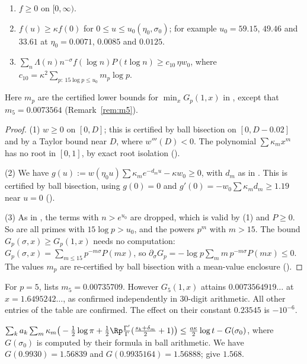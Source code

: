 \begin{lemma}\label{lem:L1011}
\begin{enumerate}
\item $f \ge 0$ on $[0,\infty)$.
\item $f(u) \ge \kappa f(0)$ for $0 \le u \le u_0(\eta_0,\sigma_0)$; for example $u_0 = 59.15$, $49.46$ and $33.61$ at $\eta_0 = 0.0071$, $0.0085$ and $0.0125$.
\item $\sum_n\Lambda(n)n^{-\sigma}f(\log n)P(t\log n) \ge c_{10}\,\eta w_0$, where $c_{10} = \kappa^2\sum_{p:\ 15\log p\le u_0}m_p\log p$.
\end{enumerate}
Here $m_p$ are the certified lower bounds for $\min_x G_p(1,x)$ in \cite[Table~1]{BTY}, except that $m_5 = 0.0073564$ (Remark~\ref{rem:m5}).
\end{lemma}

\begin{proof}
(1) $w \ge 0$ on $[0,D]$; this is certified by ball bisection on $[0,D-0.02]$ and by a Taylor bound near $D$, where $w'''(D) < 0$.
The polynomial $\sum\kappa_mx^m$ has no root in $[0,1]$, by exact root isolation ().

(2) We have $g(u) := w(\eta_0u)\sum\kappa_me^{-d_mu} - \kappa w_0 \ge 0$, with $d_m$ as in \cite[Lemma~11]{BTY}.
This is certified by ball bisection, using $g(0) = 0$ and $g'(0) = -w_0\sum\kappa_md_m \ge 1.19$ near $u = 0$ ().

(3) As in \cite[Lemma~10]{BTY}, the terms with $n > e^{u_0}$ are dropped, which is valid by (1) and $P \ge 0$.
So are all primes with $15\log p > u_0$, and the powers $p^m$ with $m > 15$.
The bound $G_p(\sigma,x) \ge G_p(1,x)$ needs no computation: $G_p(\sigma,x) = \sum_{m\le15}p^{-m\sigma}P(mx)$, so $\partial_\sigma G_p = -\log p\sum_m m\,p^{-m\sigma}P(mx) \le 0$.
The values $m_p$ are re-certified by ball bisection with a mean-value enclosure ().
\end{proof}

\begin{remark}\label{rem:m5}
For $p = 5$, \cite[Table~1]{BTY} lists $m_5 = 0.00735709$.
However $G_5(1,x)$ attains $0.0073564919\ldots$ at $x = 1.6495242\ldots$, as confirmed independently in $30$-digit arithmetic.
All other entries of the table are confirmed.
The effect on their constant $0.23545$ is $-10^{-6}$.
\end{remark}

\begin{lemma}\label{lem:L12}
$\sum_k a_k\sum_m\kappa_m\big(-\frac12\log\pi + \frac12\Rp\frac{\Gamma'}{\Gamma}(\frac{s_k+\delta_m}2+1)\big) \le \frac{a\kappa}2\log t - G(\sigma_0)$, where $G(\sigma_0)$ is computed by their formula in ball arithmetic.
We have $G(0.9930) = 1.56839$ and $G(0.9935164) = 1.56888$; \cite{BTY} give $1.568$.
\end{lemma}

